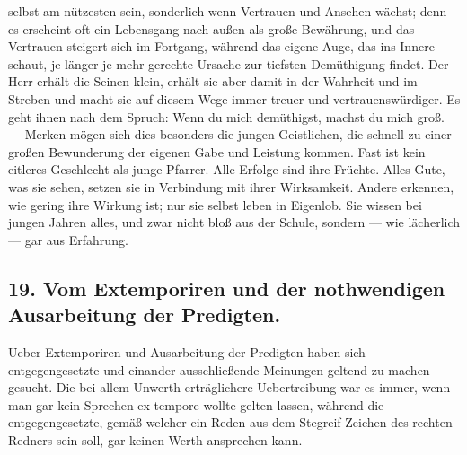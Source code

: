 selbst am nützesten sein, sonderlich wenn Vertrauen und Ansehen wächst; denn es erscheint oft ein Lebensgang nach außen als große Bewährung, und das Vertrauen steigert sich im Fortgang, während das eigene Auge, das ins Innere schaut, je länger je mehr gerechte Ursache zur tiefsten Demüthigung findet. Der Herr erhält die Seinen klein, erhält sie aber damit in der Wahrheit und im Streben und macht sie auf diesem Wege immer treuer und vertrauenswürdiger. Es geht ihnen nach dem Spruch: Wenn du mich demüthigst, machst du mich groß. — Merken mögen sich dies besonders die jungen Geistlichen, die schnell zu einer großen Bewunderung der eigenen Gabe und Leistung kommen. Fast ist kein eitleres Geschlecht als junge Pfarrer. Alle Erfolge sind ihre Früchte. Alles Gute, was sie sehen, setzen sie in Verbindung mit ihrer Wirksamkeit. Andere erkennen, wie gering ihre Wirkung ist; nur sie selbst leben in Eigenlob. Sie wissen bei jungen Jahren alles, und zwar nicht bloß aus der Schule, sondern — wie lächerlich — gar aus Erfahrung.

\subsection*{19. Vom Extemporiren und der nothwendigen Ausarbeitung der Predigten.}

Ueber Extemporiren und Ausarbeitung der Predigten haben sich entgegengesetzte und einander ausschließende Meinungen geltend zu machen gesucht. Die bei allem Unwerth erträglichere Uebertreibung war es immer, wenn man gar kein Sprechen ex tempore wollte gelten lassen, während die entgegengesetzte,
gemäß welcher ein Reden aus dem Stegreif Zeichen des rechten Redners sein soll, gar keinen Werth ansprechen kann.

